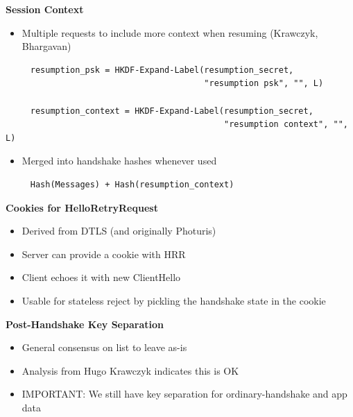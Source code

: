 \documentclass[helvetica]{seminar}
\newcommand{\heading}[1]{%
  \begin{center} 
    \large\bf 
    #1 
  \end{center} 
  \vspace{.4 in}}
\begin{document}
\begin{slide}
\heading{Session Context}

\begin{itemize}
\item Multiple requests to include more context when resuming (Krawczyk, Bhargavan)
\end{itemize}

{\footnotesize
\begin{verbatim}
     resumption_psk = HKDF-Expand-Label(resumption_secret,
                                        "resumption psk", "", L)

     resumption_context = HKDF-Expand-Label(resumption_secret,
                                            "resumption context", "", L)
\end{verbatim}
}

\begin{itemize}
\item Merged into handshake hashes whenever used
\end{itemize}

{\footnotesize
\begin{verbatim}
     Hash(Messages) + Hash(resumption_context)
\end{verbatim}
}
\end{slide}


\begin{slide}
\heading{Cookies for HelloRetryRequest}

\begin{itemize}
\item Derived from DTLS (and originally Photuris)
\item Server can provide a cookie with HRR 
\item Client echoes it with new ClientHello
\item Usable for stateless reject by pickling the handshake state in the cookie
\end{itemize}
\end{slide}


\begin{slide}
\heading{Post-Handshake Key Separation}

\begin{itemize}
\item General consensus on list to leave as-is
\item Analysis from Hugo Krawczyk indicates this is OK
\item IMPORTANT: We still have key separation for ordinary-handshake and app data
\end{itemize}
\end{slide}
\end{document}
